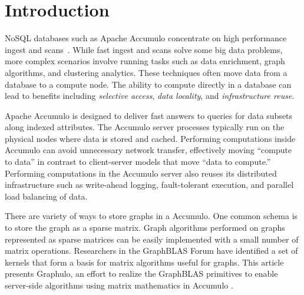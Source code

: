 
\section{Introduction}
\label{sIntro}
% 


NoSQL databases such as Apache Accumulo
concentrate on high performance ingest and scans~\cite{sen2013benchmarking}. 
While fast ingest and scans solve some big data problems,
more complex scenarios involve running tasks
such as data enrichment, graph algorithms, and clustering analytics. These techniques
often move data from a database %
to a compute node. The ability to
compute directly in a database can lead to benefits including 
\emph{selective access}, \emph{data locality}, and \emph{infrastructure reuse}. 

Apache Accumulo is designed to deliver
fast answers to queries for data subsets along indexed attributes. 
The Accumulo server processes typically run on the physical nodes where data is stored and cached.
Performing computations inside Accumulo can avoid unnecessary network transfer,
effectively moving ``compute to data''
in contrast to client-server models that move ``data to compute.''
Performing computations in the Accumulo server also reuses its distributed infrastructure
such as write-ahead logging, fault-tolerant execution, and 
parallel load balancing of data.

There are variety of ways to store graphs in a Accumulo.  One common schema is
to store the graph as a sparse matrix.  Graph algorithms performed on graphs
represented as sparse matrices can be easily implemented with a small number
of matrix operations. 
Researchers in the GraphBLAS Forum \cite{mattson2014standards} 
have identified a set of kernels
that form a basis for matrix algorithms useful for graphs.
This article presents Graphulo, an effort to realize the GraphBLAS primitives 
to enable server-side algorithms using matrix mathematics in Accumulo \cite{gadepally2015gabb}.

